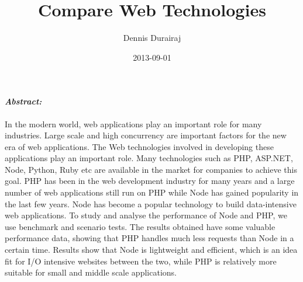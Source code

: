 \documentclass[a4paper, onecolumn, oneside, 11pt, wide, floatssmall]{mwrep}
\title{Compare Web Technologies}
\date{2013-09-01}
\author{Dennis Durairaj}
\begin{document}
\maketitle
{}
\newpage

\paragraph{\textit{Abstract:}}

In the modern world, web applications play an important role for many industries. Large scale and high concurrency are important factors for the new era of web applications. The Web technologies involved in developing these applications play an important role. Many technologies such as PHP, ASP.NET, Node, Python, Ruby etc are available in the market for companies to achieve this goal. PHP has been in the web development industry for many years and a large number of web applications still run on PHP while Node has gained popularity in the last few years. Node has become a popular technology to build data-intensive web applications. To study and analyse the performance of Node and PHP, we use benchmark and scenario tests. The results obtained have some valuable performance data, showing that PHP handles much less requests than Node in a certain time. Results show that Node is lightweight and efficient, which is an idea fit for I/O intensive websites between the two, while PHP is relatively more suitable for small and middle scale applications.

\newpage
{}



\end{document}
